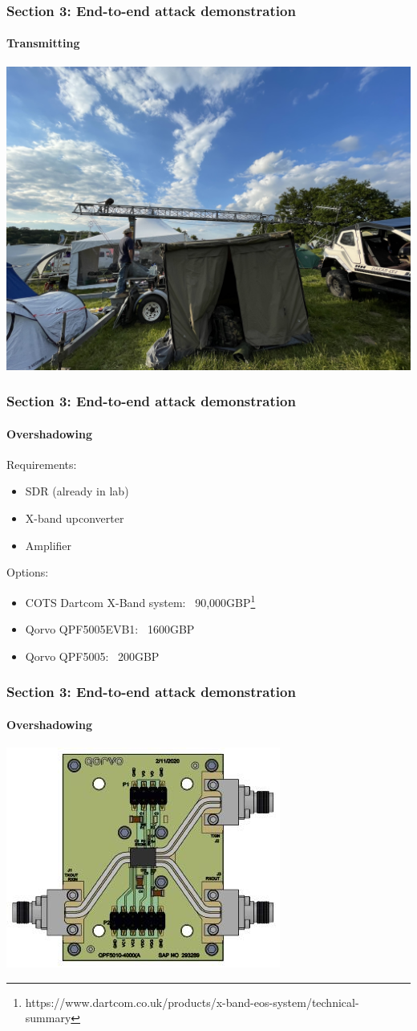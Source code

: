 \documentclass{beamer}
\begin{document}
\begin{frame}
  \frametitle{Section 3: End-to-end attack demonstration}
  \framesubtitle{Transmitting}
  \centering
  \includegraphics[width=0.6\columnwidth]{images/photos/emf_antenna.jpg}
\end{frame}

\begin{frame}
  \frametitle{Section 3: End-to-end attack demonstration}
  \framesubtitle{Overshadowing}
  Requirements:
  \begin{itemize}
    \item SDR (already in lab)
    \item X-band upconverter
    \item Amplifier
  \end{itemize}

  Options:
  \begin{itemize}
    \item COTS Dartcom X-Band system: ~90,000GBP\footnote{https://www.dartcom.co.uk/products/x-band-eos-system/technical-summary}
    \item Qorvo QPF5005EVB1: ~1600GBP
    \item Qorvo QPF5005: ~200GBP
  \end{itemize}
\end{frame}

\begin{frame}
  \frametitle{Section 3: End-to-end attack demonstration}
  \framesubtitle{Overshadowing}

  \centering
  \includegraphics[width=0.6\columnwidth]{images/QPF5005EVB_SPL.jpg}
\end{frame}
\end{document}
